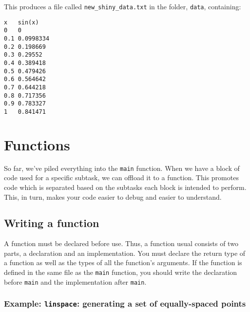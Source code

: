 \documentclass[11pt]{article}
\begin{document}
This produces a file called \texttt{new\_shiny\_data.txt} in the folder, \texttt{data}, 
containing:

\begin{verbatim}
x   sin(x)
0   0
0.1 0.0998334
0.2 0.198669
0.3 0.29552
0.4 0.389418
0.5 0.479426
0.6 0.564642
0.7 0.644218
0.8 0.717356
0.9 0.783327
1   0.841471
\end{verbatim}

\section{Functions}
\label{sec:orgheadline18}

So far, we've piled everything into the \texttt{main} function. When we have a block of 
code used for a specific subtask, we can offload it to a function. This promotes 
code which is separated based on the subtasks each block is intended to perform. 
This, in turn, makes your code easier to debug and easier to understand.  

\subsection{Writing a function}
\label{sec:orgheadline41}

A function must be declared before use. Thus, a function usual consists of two
parts, a declaration and an implementation. You must declare the return type 
of a function as well as the types of all the function's arguments. If the 
function is defined in the same file as the \texttt{main} function, you should write
the declaration before \texttt{main} and the implementation after \texttt{main}.

\subsubsection{Example: \texttt{linspace}: generating a set of equally-spaced points}
\label{sec:orgheadline40}
\end{document}
